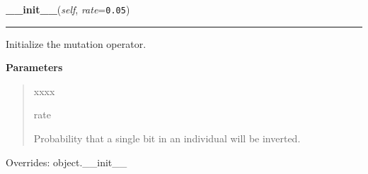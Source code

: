     \begin{boxedminipage}{\textwidth}

    \raggedright \textbf{\_\_init\_\_}(\textit{self}, \textit{rate}=\texttt{0.05})

    \vspace{-1.5ex}

    \rule{\textwidth}{0.5\fboxrule}

Initialize the mutation operator.
    \vspace{1ex}

      \textbf{Parameters}
      \begin{quote}
        \begin{Ventry}{xxxx}

          \item[rate]


Probability that a single bit in an individual will be inverted.
        \end{Ventry}

      \end{quote}

    \vspace{1ex}

      Overrides: object.\_\_init\_\_

    \end{boxedminipage}

    \label{peach:ga:mutation:BitToBit:__call__}

    \vspace{0.5ex}

